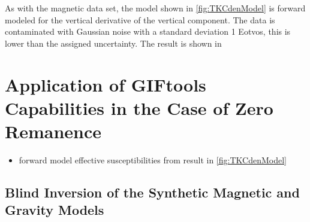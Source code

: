 As with the magnetic data set, the model shown in  \autoref{fig:TKCdenModel} is forward modeled for the vertical derivative of the vertical component. The data is contaminated with Gaussian noise with a standard deviation 1 Eotvos, this is lower than the assigned uncertainty. The result is shown in 

\section{Application of GIFtools Capabilities in the Case of Zero Remanence}
\label{sec:TKCnoRem}

\begin{itemize}
\item forward model effective susceptibilities from result in \autoref{fig:TKCdenModel}
\end{itemize}

\subsection{Blind Inversion of the Synthetic Magnetic and Gravity Models}
\label{subsec:TKCblind}

